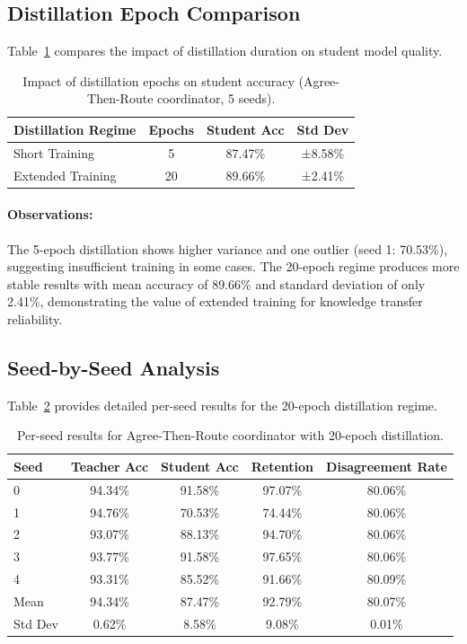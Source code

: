 \documentclass[12pt]{article}
\begin{document}
\subsection{Distillation Epoch Comparison}

Table~\ref{tab:epochs_comparison} compares the impact of distillation duration on student model quality.

\begin{table}[h]
\centering
\caption{Impact of distillation epochs on student accuracy (Agree-Then-Route coordinator, 5 seeds).}
\label{tab:epochs_comparison}
\begin{tabular}{lccc}
\toprule
\textbf{Distillation Regime} & \textbf{Epochs} & \textbf{Student Acc} & \textbf{Std Dev} \\
\midrule
Short Training & 5 & 87.47\% & ±8.58\% \\
Extended Training & 20 & 89.66\% & ±2.41\% \\
\bottomrule
\end{tabular}
\end{table}

\paragraph{Observations:}

The 5-epoch distillation shows higher variance and one outlier (seed 1: 70.53\%), suggesting insufficient training in some cases. The 20-epoch regime produces more stable results with mean accuracy of 89.66\% and standard deviation of only 2.41\%, demonstrating the value of extended training for knowledge transfer reliability.

\subsection{Seed-by-Seed Analysis}

Table~\ref{tab:seed_analysis_20ep} provides detailed per-seed results for the 20-epoch distillation regime.

\begin{table}[h]
\centering
\caption{Per-seed results for Agree-Then-Route coordinator with 20-epoch distillation.}
\label{tab:seed_analysis_20ep}
\begin{tabular}{lcccc}
\toprule
\textbf{Seed} & \textbf{Teacher Acc} & \textbf{Student Acc} & \textbf{Retention} & \textbf{Disagreement Rate} \\
\midrule
0 & 94.34\% & 91.58\% & 97.07\% & 80.06\% \\
1 & 94.76\% & 70.53\% & 74.44\% & 80.06\% \\
2 & 93.07\% & 88.13\% & 94.70\% & 80.06\% \\
3 & 93.77\% & 91.58\% & 97.65\% & 80.06\% \\
4 & 93.31\% & 85.52\% & 91.66\% & 80.09\% \\
\midrule
Mean & 94.34\% & 87.47\% & 92.79\% & 80.07\% \\
Std Dev & 0.62\% & 8.58\% & 9.08\% & 0.01\% \\
\bottomrule
\end{tabular}
\end{table}
\end{document}
